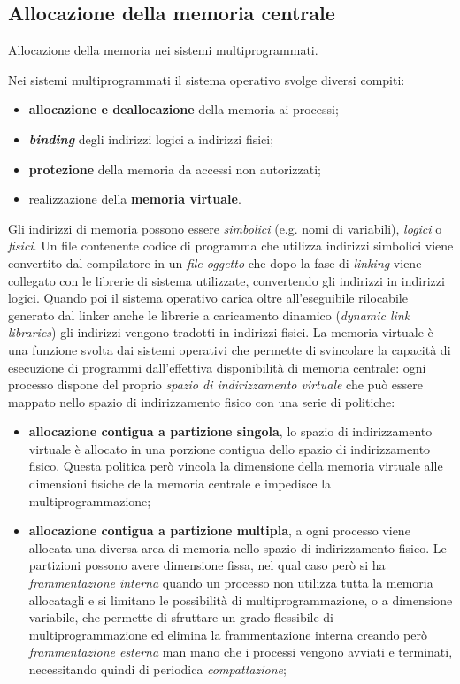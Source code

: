 \documentclass[answers,a4paper,12pt]{exam}
\begin{document}
\begin{questions}
\section{Allocazione della memoria centrale}
\question
Allocazione della memoria nei sistemi multiprogrammati.
\begin{solutionorlines}[3.8in]
	Nei sistemi multiprogrammati il sistema operativo svolge diversi compiti:
	\begin{itemize}
		\item \textbf{allocazione e deallocazione} della memoria ai processi;
		\item \textbf{\textit{binding}} degli indirizzi logici a indirizzi fisici;
		\item \textbf{protezione} della memoria da accessi non autorizzati;
		\item realizzazione della \textbf{memoria virtuale}.
	\end{itemize}
	Gli indirizzi di memoria possono essere \textit{simbolici} (e.g. nomi di variabili), \textit{logici} o \textit{fisici}. Un file contenente codice di programma che utilizza indirizzi simbolici viene convertito dal compilatore in un \textit{file oggetto} che dopo la fase di \textit{linking} viene collegato con le librerie di sistema utilizzate, convertendo gli indirizzi in indirizzi logici. Quando poi il sistema operativo carica oltre all'eseguibile rilocabile generato dal linker anche le librerie a caricamento dinamico (\textit{dynamic link libraries}) gli indirizzi vengono tradotti in indirizzi fisici.
	La memoria virtuale è una funzione svolta dai sistemi operativi che permette di svincolare la capacità di esecuzione di programmi dall'effettiva disponibilità di memoria centrale: ogni processo dispone del proprio \textit{spazio di indirizzamento virtuale} che può essere mappato nello spazio di indirizzamento fisico con una serie di politiche:
	\begin{itemize}
		\item \textbf{allocazione contigua a partizione singola}, lo spazio di indirizzamento virtuale è allocato in una porzione contigua dello spazio di indirizzamento fisico. Questa politica però vincola la dimensione della memoria virtuale alle dimensioni fisiche della memoria centrale e impedisce la multiprogrammazione;
		\item \textbf{allocazione contigua a partizione multipla}, a ogni processo viene allocata una diversa area di memoria nello spazio di indirizzamento fisico. Le partizioni possono avere dimensione fissa, nel qual caso però si ha \textit{frammentazione interna} quando un processo non utilizza tutta la memoria allocatagli e si limitano le possibilità di multiprogrammazione, o a dimensione variabile, che permette di sfruttare un grado flessibile di multiprogrammazione ed elimina la frammentazione interna creando però \textit{frammentazione esterna} man mano che i processi vengono avviati e terminati, necessitando quindi di periodica \textit{compattazione};

\end{itemize}
\end{solutionorlines}
\end{questions}
\end{document}

